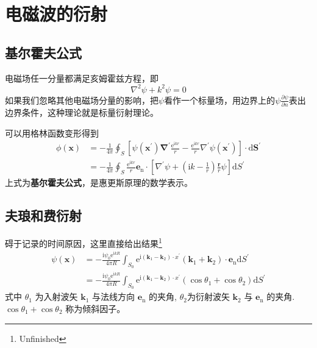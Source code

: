 \section{电磁波的衍射}
    \subsection{基尔霍夫公式}
        电磁场任一分量都满足亥姆霍兹方程，即\[\nabla^2 \psi +k^2 \psi =0\]如果我们忽略其他电磁场分量的影响，把$\psi$看作一个标量场，用边界上的$\psi$$ \frac{\partial \psi}{\partial n}$表出边界条件，这种理论就是标量衍射理论。

        可以用格林函数变形得到
        \begin{equation}
            \begin{aligned}
            \phi(\boldsymbol{x}) &=-\frac{1}{4 \pi} \oint_{S}\left[\psi\left(\boldsymbol{x}^{\prime}\right) \boldsymbol{\nabla}^{\prime} \frac{\mathrm{e}^{\mathrm{i} k r}}{r}-\frac{\mathrm{e}^{\mathrm{i} k r}}{r} \nabla^{\prime} \psi\left(\boldsymbol{x}^{\prime}\right)\right] \cdot \mathrm{d} \boldsymbol{S}^{\prime} \\
            &=-\frac{1}{4 \pi} \oint_{S} \frac{\mathrm{e}^{\mathrm{i} k r}}{r} \boldsymbol{e}_{\mathrm{n}} \cdot\left[\nabla^{\prime} \psi+\left(\mathrm{i} k-\frac{1}{r}\right) \frac{\boldsymbol{r}}{r} \psi\right] \mathrm{d} S^{\prime}
            \end{aligned}
            \end{equation}
        上式为\textbf{基尔霍夫公式}，是惠更斯原理的数学表示。
    \subsection{夫琅和费衍射}
        碍于记录的时间原因，这里直接给出结果\footnote{Unfinished}
        \begin{equation}
            \begin{aligned}
            \psi(\boldsymbol{x}) &=-\frac{\mathrm{i} \psi_{0} \mathrm{e}^{\mathrm{i} k R}}{4 \pi R} \int_{S_{0}} \mathrm{e}^{\mathrm{i}\left(\boldsymbol{k}_{1}-\boldsymbol{k}_{2}\right) \cdot x^{\prime}}\left(\boldsymbol{k}_{1}+\boldsymbol{k}_{2}\right) \cdot \boldsymbol{e}_{\mathrm{n}} \mathrm{d} S^{\prime} \\
            &=-\frac{\mathrm{i} \psi_{0} \mathrm{e}^{\mathrm{i} k R}}{4 \pi R} \int_{S_{0}} \mathrm{e}^{\mathrm{i}\left(\boldsymbol{k}_{1}-\boldsymbol{k}_{2}\right) \cdot x^{\prime}}\left(\cos \theta_{1}+\cos \theta_{2}\right) \mathrm{d} S^{\prime}
            \end{aligned}
            \end{equation}
        式中 $\theta_{1}$ 为入射波矢 $\boldsymbol{k}_{1}$ 与法线方向 $\boldsymbol{e}_{\mathrm{n}}$ 的夹角, $\theta_{2}$为衍射波矢 $\boldsymbol{k}_{2}$ 与 $\boldsymbol{e}_{\mathrm{n}}$ 的夹角. $\cos \theta_{1}+\cos \theta_{2}$ 称为倾斜因子。
